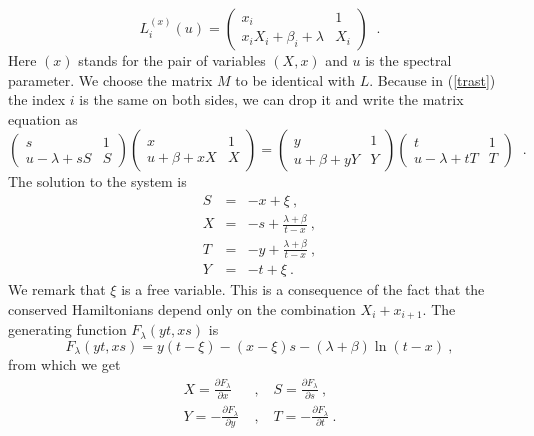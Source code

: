 \documentclass[a4paper,11pt]{article}
\begin{document}
\begin{equation}
\label{Lax11}
 L_i^{(x)}(u)=\left(\begin{array}{cc}
          x_i      & 1  \\
           x_iX_i+\beta_i+\lambda      &  X_i
         \end{array}\right )\;\;.
\end{equation}
Here $(x)$ stands for the pair of variables $(X,x)$ and $u$ is the spectral
parameter. We choose the matrix $M$ to be identical with $L$. Because in
(\ref{trast}) the index $i$ is the same on both sides, we can drop it and
write the matrix equation as
\begin{equation}
\label{mateq}
\left(\begin{array}{cc}
          s      & 1  \\
           u-\lambda +sS    &  S
         \end{array}\right )\left(\begin{array}{cc}
          x      & 1  \\
           u+\beta+xX     &  X
         \end{array}\right )=\left(\begin{array}{cc}
          y     & 1  \\
           u+\beta+yY    &  Y
         \end{array}\right )\left(\begin{array}{cc}
          t      & 1  \\
           u-\lambda+tT    &  T
         \end{array}\right )\;\;.
\end{equation}
The solution to the system is
\begin{eqnarray}
\label{solution2}
S&=&-x+\xi ~,\\
X&=&-s+\frac{\lambda +\beta}{t-x} ~,\\
T&=&-y+\frac{\lambda +\beta}{t-x} ~,\\
Y&=&-t+\xi ~.
\end{eqnarray}
We remark that $\xi$ is a free variable. This is a consequence of the fact
that the conserved Hamiltonians depend only on the combination
$X_i+x_{i+1}$. The generating function $F_{\lambda}(yt,xs)$ is
\begin{equation}
\label{gener}
F_{\lambda}(yt,xs)=y(t-\xi)-(x-\xi)s-(\lambda+\beta)\ln(t-x) ~,
\end{equation}
from which we get
\begin{eqnarray}
\label{deriv}
X=\frac{\partial F_\lambda}{\partial x}\;&,&\;
S=\frac{\partial F_\lambda}{\partial s}~,\\
Y=-\frac{\partial F_\lambda}{\partial y}\;&,&\;
T=-\frac{\partial F_\lambda}{\partial t} ~.
\end{eqnarray}
\end{document}

